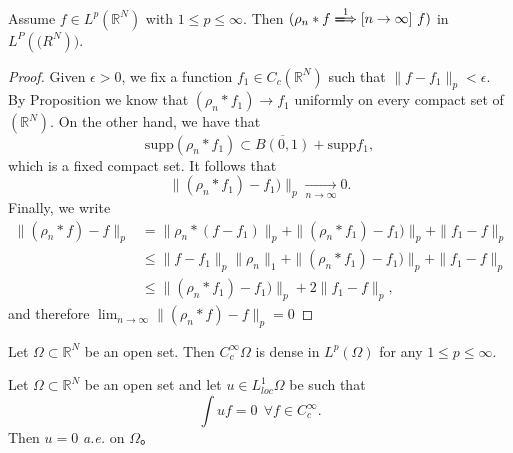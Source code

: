 \documentclass[a4paper]{book}
\begin{document}
    \begin{thm}
        Assume $f \in L^p(\mathbb R^N)$ with $1 \le p \le \infty$. Then $(\rho_n*f \xLongrightarrow1[n\rightarrow \infty]\ f)$ in $L^P(\mathbb(R^N))$.
        \begin{proof}
            Given $\epsilon > 0$, we fix a function $f_1 \in C_c(\mathbb R^N)$ such that $\| f-f_1 \|_p < \epsilon$. By Proposition we know that $(\rho_n*f_1) \rightarrow f_1$ uniformly on every compact set of $(\mathbb R^N)$. On the other hand, we have that \[ \text{supp}(\rho_n*f_1) \subset \overline{B(0,1)}+\text{supp}f_1,\] which is a fixed compact set. It follows that \[ \| (\rho_n*f_1)-f_1)\|_p \xrightarrow[n\rightarrow \infty]\ 0.\]
            Finally, we write
                \begin{align*}
                 \| (\rho_n*f)-f \|_{p} &= \|  \rho_{n} * (f-f_{1})  \| _{p} +  \| (\rho_n*f_{1})-f_{1})\|_{p} + \| f_1-f \|_{p} \\
                                        &\le \| f - f_{1} \| _{p}  \| \rho_ {n} \|_1 +  \| (\rho_n*f_{1})-f_{1})\|_{p} + \| f_1-f \|_{p}\\
                                        &\le \| (\rho_n*f_{1})-f_{1})\|_{p} + 2 \| f_1-f \|_{p},
                \end{align*}
            and therefore $\lim_{n \rightarrow \infty}\| (\rho_n*f)-f \|_{p}=0$
        \end{proof}
    \end{thm}
    \begin{cor}
        Let $\Omega \subset \mathbb R^N$ be an open set. Then $C^\infty_c{\Omega}$ is dense in $L^p(\Omega)$ for any $1 \le p \le \infty$.
    \end{cor}
    \begin{cor}
        Let $\Omega \subset \mathbb R^N$ be an open set and let $u \in L^1_{loc}{\Omega}$ be such that \[ \int uf=0 \ \ \forall f \in C_c^{\infty}.\]  Then $u=0$ \emph{a.e.} on $\Omega$。
    \end{cor}
\end{document}

